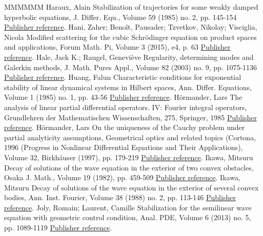 \documentclass[11pt]{article}
\theoremstyle{definition}
\numberwithin{equation}{section}
\numberwithin{figure}{section}
\numberwithin{table}{section}
\begin{document}
\begin{thebibliography}{MMMMMM}
 Haraux, Alain Stabilization of trajectories for some weakly damped hyperbolic equations, J. Differ. Equ., Volume 59 (1985) no. 2, pp. 145-154 \href{https://ahl.centre-mersenne.org/item/AHL_2020__3__1241_0/#Haraux}{Publisher reference}.
 Hani, Zaher; Benoît, Pausader; Tzvetkov, Nikolay; Visciglia, Nicola Modified scattering for the cubic Schrödinger equation on product spaces and applications, Forum Math. Pi, Volume 3 (2015), e4, p. 63 \href{https://ahl.centre-mersenne.org/item/AHL_2020__3__1241_0/#Hani}{Publisher reference}.
 Hale, Jack K.; Raugel, Geneviève Regularity, determining modes and Galerkin methods, J. Math. Pures Appl., Volume 82 (2003) no. 9, pp. 1075-1136 \href{https://ahl.centre-mersenne.org/item/AHL_2020__3__1241_0/#Hale-Raugel}{Publisher reference}.
 Huang, Falun Characteristic conditions for exponential stability of linear dynamical systems in Hilbert spaces, Ann. Differ. Equations, Volume 1 (1985) no. 1, pp. 43-56 \href{https://ahl.centre-mersenne.org/item/AHL_2020__3__1241_0/#Huang}{Publisher reference}.
 Hörmander, Lars The analysis of linear partial differential operators. IV: Fourier integral operators, Grundlehren der Mathematischen Wissenschaften, 275, Springer, 1985 \href{https://ahl.centre-mersenne.org/item/AHL_2020__3__1241_0/#Hormander}{Publisher reference}.
 Hörmander, Lars On the uniqueness of the Cauchy problem under partial analyticity assumptions, Geometrical optics and related topics (Cortona, 1996 (Progress in Nonlinear Differential Equations and Their Applications), Volume 32, Birkhäuser (1997), pp. 179-219 \href{https://ahl.centre-mersenne.org/item/AHL_2020__3__1241_0/#Hormander_uniq_analytic}{Publisher reference}.
 Ikawa, Mitsuru Decay of solutions of the wave equation in the exterior of two convex obstacles, Osaka J. Math., Volume 19 (1982), pp. 459-509 \href{https://ahl.centre-mersenne.org/item/AHL_2020__3__1241_0/#Ikawa1}{Publisher reference}.
 Ikawa, Mitsuru Decay of solutions of the wave equation in the exterior of several convex bodies, Ann. Inst. Fourier, Volume 38 (1988) no. 2, pp. 113-146 \href{https://ahl.centre-mersenne.org/item/AHL_2020__3__1241_0/#Ikawa2}{Publisher reference}.
 Joly, Romain; Laurent, Camille Stabilization for the semilinear wave equation with geometric control condition, Anal. PDE, Volume 6 (2013) no. 5, pp. 1089-1119 \href{https://ahl.centre-mersenne.org/item/AHL_2020__3__1241_0/#RC}{Publisher reference}.

\end{thebibliography}
\end{document}
